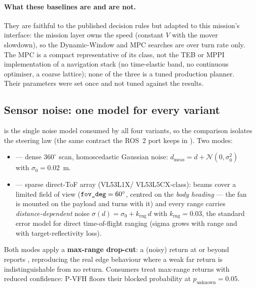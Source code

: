 \paragraph{What these baselines are and are not.} They are faithful to the
published decision rules but adapted to this mission's interface: the
mission layer owns the speed (constant $V$ with the mover slowdown), so the
Dynamic-Window and MPC searches are over turn rate only. The MPC is a
compact representative of its class, not the TEB or MPPI implementation of
a navigation stack (no time-elastic band, no continuous optimiser, a
coarse lattice); none of the three is a tuned production planner. Their
parameters were set once and not tuned against the results.

\subsection{Sensor noise: one model for every variant}
\label{sec:sensornoise}

 is the single noise model consumed by all four
variants, so the comparison isolates the steering law (the same contract the
ROS~2 port keeps in ). Two modes:

\begin{itemize}[leftmargin=1.6em]
\item \textbf{} --- dense $360^\circ$ scan, homoscedastic
Gaussian noise: $d_{\mathrm{meas}} = d + \mathcal{N}(0, \sigma_0^2)$ with
$\sigma_0 = 0.02$~m.
\item \textbf{} --- sparse direct-ToF array (VL53L1X/
VL53L5CX-class): beams cover a limited field of view
($\texttt{fov\_deg} = 60^\circ$, centred on the \emph{body heading} --- the fan
is mounted on the payload and turns with it) and
every range carries \emph{distance-dependent} noise
$\sigma(d) = \sigma_0 + k_{\mathrm{rng}}\,d$ with $k_{\mathrm{rng}} = 0.03$,
the standard error model for direct time-of-flight ranging (sigma grows with
range and with target-reflectivity loss).
\end{itemize}

Both modes apply a \textbf{max-range drop-cut}: a (noisy) return at or beyond
 reports , reproducing the real edge
behaviour where a weak far return is indistinguishable from no return.
Consumers treat max-range returns with reduced confidence: P-VFH floors their
blocked probability at $p_{\mathrm{unknown}} = 0.05$.

